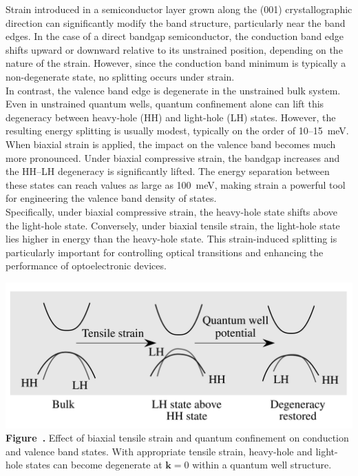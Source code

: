 Strain introduced in a semiconductor layer grown along the (001) crystallographic direction can significantly modify the band structure, particularly near the band edges. In the case of a direct bandgap semiconductor, the conduction band edge shifts upward or downward relative to its unstrained position, depending on the nature of the strain. However, since the conduction band minimum is typically a non-degenerate state, no splitting occurs under strain.\\
In contrast, the valence band edge is degenerate in the unstrained bulk system. Even in unstrained quantum wells, quantum confinement alone can lift this degeneracy between heavy-hole (HH) and light-hole (LH) states. However, the resulting energy splitting is usually modest, typically on the order of 10–15~meV.\\
When biaxial strain is applied, the impact on the valence band becomes much more pronounced. Under biaxial compressive strain, the bandgap increases and the HH–LH degeneracy is significantly lifted. The energy separation between these states can reach values as large as 100~meV, making strain a powerful tool for engineering the valence band density of states.\\
Specifically, under biaxial compressive strain, the heavy-hole state shifts above the light-hole state. Conversely, under biaxial tensile strain, the light-hole state lies higher in energy than the heavy-hole state. This strain-induced splitting is particularly important for controlling optical transitions and enhancing the performance of optoelectronic devices.
\begin{center}
	\begin{minipage}{0.7\textwidth}
		\centering
		\includegraphics[width=\textwidth]{img/Tensile_Strain.png}
		\\[0.5em]
		\textbf{Figure~\thefigure.} Effect of biaxial tensile strain and quantum confinement on conduction and valence band states. With appropriate tensile strain, heavy-hole and light-hole states can become degenerate at $\mathbf{k} = 0$ within a quantum well structure.
		\label{fig:tensile_strain}
	\end{minipage}
\end{center}

